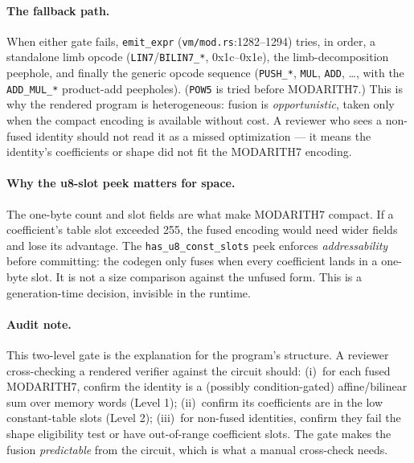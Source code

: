 \paragraph{The fallback path.}
When either gate fails, \texttt{emit\_expr}
(\texttt{vm/mod.rs}:1282--1294) tries, in order, a standalone
limb opcode (\texttt{LIN7}/\texttt{BILIN7\_*}, 0x1c--0x1e), the
limb-decomposition peephole, and finally the generic opcode
sequence (\texttt{PUSH\_*}, \texttt{MUL}, \texttt{ADD},
\ldots, with the \texttt{ADD\_MUL\_*} product-add peepholes).
(\texttt{POW5} is tried before MODARITH7.) This is why the
rendered program is heterogeneous: fusion is \emph{opportunistic},
taken only when the compact encoding is available without cost.
A reviewer who sees a non-fused identity should not read it as a
missed optimization --- it means the identity's coefficients or
shape did not fit the MODARITH7 encoding.

\paragraph{Why the u8-slot peek matters for space.}
The one-byte count and slot fields are what make MODARITH7 compact.
If a coefficient's table slot exceeded 255, the fused encoding
would need wider fields and lose its advantage. The
\texttt{has\_\allowbreak{}u8\_\allowbreak{}const\_\allowbreak{}slots} peek enforces
\emph{addressability} before committing: the codegen only fuses
when every coefficient lands in a one-byte slot. It is not a size
comparison against the unfused form. This is a generation-time
decision, invisible in the runtime.

\paragraph{Audit note.} This two-level gate is the explanation for
the program's structure. A reviewer cross-checking a rendered
verifier against the circuit should: (i)~for each fused MODARITH7,
confirm the identity is a (possibly condition-gated) affine/bilinear
sum over memory words (Level 1);
(ii)~confirm its coefficients are in the low constant-table slots
(Level 2); (iii)~for non-fused identities, confirm they fail the
shape eligibility test or have out-of-range coefficient slots. The gate makes the fusion \emph{predictable} from the
circuit, which is what a manual cross-check needs.

